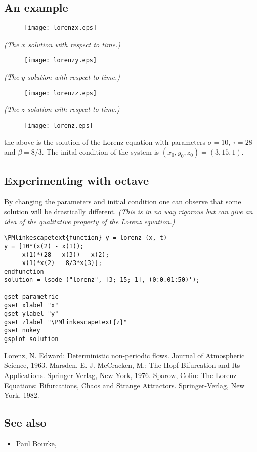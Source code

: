 \documentclass[12pt]{article}
\begin{document}
\subsection{An example}
\begin{center}
\begin{figure}
\texttt{[image: lorenzx.eps]}\\
\end{figure}
\textit{(The $x$ solution with respect to time.)}
\begin{figure}
\texttt{[image: lorenzy.eps]}\\
\end{figure}
\textit{(The $y$ solution with respect to time.)}
\begin{figure}
\texttt{[image: lorenzz.eps]}\\
\end{figure}
\textit{(The $z$ solution with respect to time.)}
\begin{figure}
\texttt{[image: lorenz.eps]}\\
\end{figure}
\end{center}
the above is the solution of the Lorenz equation with parameters $\sigma = 10$, $\tau = 28$ and $\beta = 8/3$.  The inital condition of the system is $(x_0,y_0,z_0)= (3,15,1)$.\\

\subsection{Experimenting with octave}
By changing the parameters and initial condition one can observe that some solution will be drastically different. \textit{(This is in no way rigorous but can give an idea of the qualitative property of the Lorenz equation.)}
\begin{verbatim}
\PMlinkescapetext{function} y = lorenz (x, t)
y = [10*(x(2) - x(1));
     x(1)*(28 - x(3)) - x(2);
     x(1)*x(2) - 8/3*x(3)];
endfunction
solution = lsode ("lorenz", [3; 15; 1], (0:0.01:50)');

gset parametric
gset xlabel "x"
gset ylabel "y"
gset zlabel "\PMlinkescapetext{z}"
gset nokey
gsplot solution
\end{verbatim}

\begin{thebibliography}{1}
 Lorenz, N. Edward: Deterministic non-periodic flows. Journal of Atmospheric Science, 1963.
 Marsden, E. J. McCracken, M.: The Hopf Bifurcation and Its Applications.  Springer-Verlag, New York, 1976. 
 Sparow, Colin: The Lorenz Equations: Bifurcations, Chaos and Strange Attractors.  Springer-Verlag, New York, 1982. 
\end{thebibliography}

\subsection{See also}
\begin{itemize}
\item Paul Bourke, 
\end{itemize}
\end{document}
